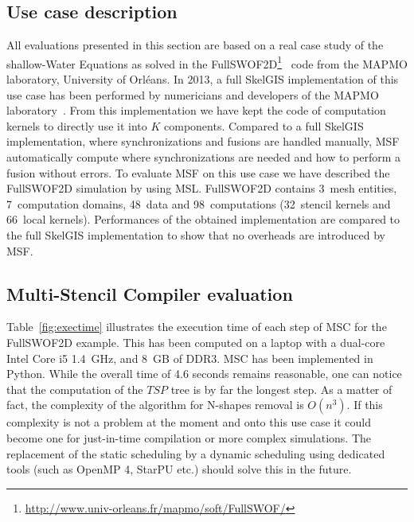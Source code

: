 \subsection{Use case description}

All evaluations presented in this section are based on a real case study of the shallow-Water Equations as solved in the FullSWOF2D\footnote{\url{http://www.univ-orleans.fr/mapmo/soft/FullSWOF/}}~\cite{Ferrari2004,CPE:CPE3494} code from the MAPMO laboratory, University of Orl\'eans.
In 2013, a full SkelGIS implementation of this use case has been performed by numericians and developers of the MAPMO laboratory~\cite{CPE:CPE3494,cordier2013fullswof,coullon:hal-00832660}. From this implementation we have kept the code of computation kernels to directly use it into $K$ components. Compared to a full SkelGIS implementation, where synchronizations and fusions are handled manually, MSF automatically compute where synchronizations are needed and how to perform a fusion without errors. To evaluate MSF on this use case we have described the FullSWOF2D simulation by using MSL. FullSWOF2D contains 3~mesh entities, 7~computation domains, 48~data and 98~computations (32~stencil kernels and 66~local kernels). Performances of the obtained implementation are compared to the full SkelGIS implementation to show that no overheads are introduced by MSF.

\subsection{Multi-Stencil Compiler evaluation}

Table~\ref{fig:exectime} illustrates the execution time of each step of MSC for the FullSWOF2D example.
This has been computed on a laptop with a dual-core Intel Core i5 1.4~GHz, and 8~GB of DDR3.
MSC has been implemented in Python.
%
While the overall time of 4.6 seconds remains reasonable, one can notice that the computation of the $TSP$ tree is by far the longest step.
As a matter of fact, the complexity of the algorithm for N-shapes removal is $O(n^3)$.
If this complexity is not a problem at the moment and onto this use case it could become one for just-in-time compilation or more complex simulations. The replacement of the static scheduling by a dynamic scheduling using dedicated tools (such as OpenMP 4, StarPU etc.) should solve this in the future.

